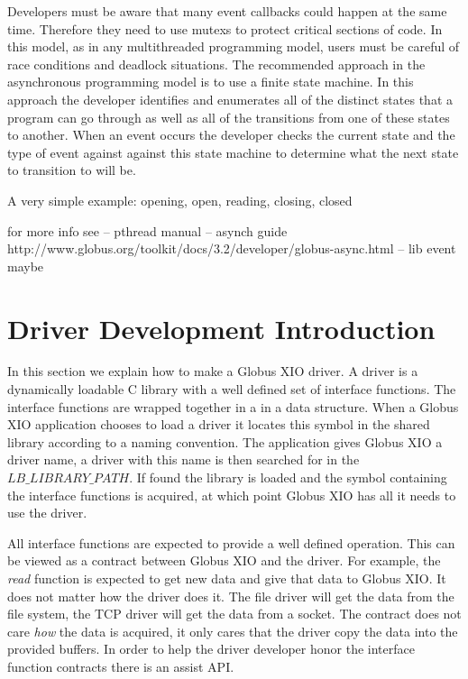 \documentclass[11pt]{article}
\begin{document}
Developers must be aware that many event callbacks could happen at the same
time.  Therefore they need to use mutexs to protect critical sections
of code.  In this model, as in any multithreaded programming model,
users must be careful of race conditions and deadlock situations.
The recommended approach in the asynchronous programming model is 
to use a finite state machine.  In this approach the developer 
identifies and enumerates all of the distinct states that a program 
can go through as well as all of the transitions from one of these
states to another.  When an event occurs the developer checks the current
state and the type of event against against this state machine to determine
what the next state to transition to will be.

A very simple example:  opening, open, reading, closing, closed

for more info see
-- pthread manual
-- asynch guide
    http://www.globus.org/toolkit/docs/3.2/developer/globus-async.html
-- lib event maybe


\section{Driver Development Introduction}
In this section we explain how to make a Globus XIO driver.  A driver is 
a dynamically loadable C library with a well defined set of interface
functions.  
The interface functions are wrapped together in a in a data structure.
When a Globus XIO application chooses to load a driver it locates this
symbol in the shared library according to a naming convention.
The application gives Globus XIO a driver name, a driver with this name
is then searched for in the $LB\_LIBRARY\_PATH$.  If found the library is
loaded and the symbol containing the interface functions is acquired,
at which point Globus XIO has all it needs to use the driver.

All interface functions are expected to provide a well defined operation.
This can be viewed as a contract between Globus XIO and the driver.
For example, the \emph{read} function is expected to get new data
and give that data to Globus XIO.  It does not matter how the driver
does it.  The file driver will get the data from the file system, the
TCP driver will get the data from a socket.  The contract does not
care \emph{how} the data is acquired, it only cares that the driver
copy the data into the provided buffers.  In order to help the driver 
developer honor the interface function contracts
there is an assist API.  
\end{document}
